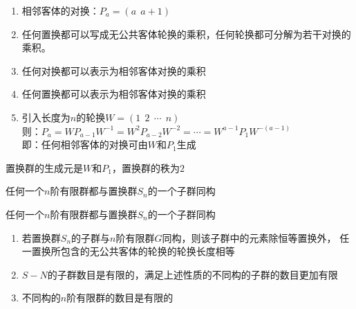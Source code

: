 \begin{newlemma}[置换群的生成元]
	\begin{enumerate}
		\item 
		相邻客体的对换：$P_a=(a~~a+1)$
		\item 
		任何置换都可以写成{\color{seco}无公共客体}轮换的乘积，任何轮换都可分解为若干对换的乘积。
		\item
		任何对换都可以表示为{\color{seco}相邻客体}对换的乘积
		\item
		任何置换都可以表示为{\color{seco}相邻客体对换}的乘积
		\item
		引入长度为$n$的轮换$W=(1~~2~~\cdots~~n)$\\
		则：$P_a=W P_{a-1} W^{-1}=W^2 P_{a-2} W^{-2}=\cdots=W^{a-1} P_{1} W^{-(a-1)}$\\
		即：{\color{seco}任何相邻客体的对换可由$W$和$P_{1}$生成}
	\end{enumerate}
\end{newlemma}

\begin{newthem}[置换群的生成元]
	置换群的生成元是$W$和$P_{1}$，置换群的秩为$2$
\end{newthem}

\clearpage

\begin{newthem}[Cayley定理]
	任何一个$n$阶有限群都与置换群$S_n$的一个子群同构
\end{newthem}

\begin{newthem}[Cayley定理]
	任何一个$n$阶有限群都与置换群$S_n$的一个子群同构
\end{newthem}



\begin{newcorol}[$n$阶有限群的数目]
	\begin{enumerate}
		\item 
		若置换群$S_n$的子群与$n$阶有限群$G$同构，则该子群中的元素除恒等置换外，
		任一置换所包含的无公共客体的轮换的轮换长度相等
		\item 
		$S-N$的子群数目是有限的，满足上述性质的不同构的子群的数目更加有限
		\item 
		不同构的$n$阶有限群的数目是有限的
	\end{enumerate}
\end{newcorol}


